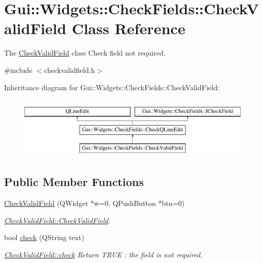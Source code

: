 \hypertarget{classGui_1_1Widgets_1_1CheckFields_1_1CheckValidField}{\section{Gui\-:\-:Widgets\-:\-:Check\-Fields\-:\-:Check\-Valid\-Field Class Reference}
\label{classGui_1_1Widgets_1_1CheckFields_1_1CheckValidField}
}


The \hyperlink{classGui_1_1Widgets_1_1CheckFields_1_1CheckValidField}{Check\-Valid\-Field} class Check field not required.  




{\ttfamily \#include $<$checkvalidfield.\-h$>$}

Inheritance diagram for Gui\-:\-:Widgets\-:\-:Check\-Fields\-:\-:Check\-Valid\-Field\-:\begin{figure}[H]
\begin{center}
\leavevmode
\includegraphics[height=3.000000cm]{d8/d6d/classGui_1_1Widgets_1_1CheckFields_1_1CheckValidField}
\end{center}
\end{figure}
\subsection*{Public Member Functions}
\begin{DoxyCompactItemize}
\item 
\hyperlink{classGui_1_1Widgets_1_1CheckFields_1_1CheckValidField_a17f7b1d7ce52fb9112a0f60fa0d4f572}{Check\-Valid\-Field} (Q\-Widget $\ast$w=0, Q\-Push\-Button $\ast$btn=0)
\begin{DoxyCompactList}\small\item\em \hyperlink{classGui_1_1Widgets_1_1CheckFields_1_1CheckValidField_a17f7b1d7ce52fb9112a0f60fa0d4f572}{Check\-Valid\-Field\-::\-Check\-Valid\-Field}. \end{DoxyCompactList}\item 
bool \hyperlink{classGui_1_1Widgets_1_1CheckFields_1_1CheckValidField_a871d7b28becd80aac9fc75a2057bb15d}{check} (Q\-String text)
\begin{DoxyCompactList}\small\item\em \hyperlink{classGui_1_1Widgets_1_1CheckFields_1_1CheckValidField_a871d7b28becd80aac9fc75a2057bb15d}{Check\-Valid\-Field\-::check} Return T\-R\-U\-E \-: the field is not required. \end{DoxyCompactList}\end{DoxyCompactItemize}
